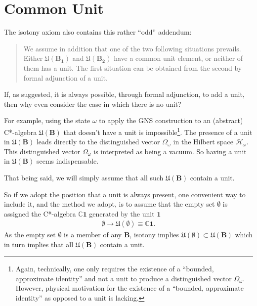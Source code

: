 \section{Common Unit}\label{sctn:common-unit}
The isotony axiom also contains this rather ``odd'' addendum:

\begin{quote}
    We assume in addition that one of the two following situations prevails. Either $\mathfrak{U}(\mathbf{B_1})$ and $\mathfrak{U}(\mathbf{B_2})$ have a common unit element, or neither of them has a unit. The first situation can be obtained from the second by formal adjunction of a unit.
\end{quote}

If, as suggested, it is always possible, through formal adjunction, to add a unit, then why even consider the case in which there is no unit?

For example, using the state $\omega$ to apply the GNS construction to an (abstract) C*-algebra $\mathfrak{U}(\mathbf{B})$ that doesn't have a unit is impossible\footnote{Again, technically, one only requires the existence of a ``bounded, approximate identity'' and not a unit to produce a distinguished vector $\Omega_\omega$. However, physical motivation for the existence of a ``bounded, approximate identity'' as opposed to a unit is lacking.}. The presence of a unit in $\mathfrak{U}(\mathbf{B})$ leads directly to the distinguished vector $\Omega_\omega$ in the Hilbert space $\mathcal{H}_\omega$. This distinguished vector $\Omega_\omega$ is interpreted as being a vacuum. So having a unit in $\mathfrak{U}(\mathbf{B})$ seems indispensable.

That being said, we will simply assume that all such $\mathfrak{U}(\mathbf{B})$ contain a unit.

So if we adopt the position that a unit is always present, one convenient way to include it, and the method we adopt, is to assume that the empty set $\emptyset$ is assigned the C*-algebra $\mathbb{C} \mathbf{1}$ generated by the unit $\mathbf{1}$
\begin{align}
    \emptyset \rightarrow \mathfrak{U}(\emptyset) \equiv \mathbb{C} \mathbf{1}.
\end{align}
As the empty set $\emptyset$ is a member of any $\mathbf{B}$, isotony implies $\mathfrak{U}(\emptyset) \subset \mathfrak{U}(\mathbf{B})$ which in turn implies that all $\mathfrak{U}(\mathbf{B})$ contain a unit.
